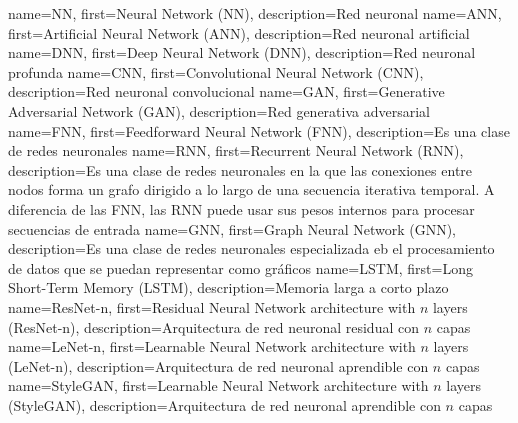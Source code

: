        {name={NN},         first={Neural Network (NN)},                                                description={Red neuronal}}
      {name={ANN},        first={Artificial Neural Network (ANN)},                                    description={Red neuronal artificial}}
      {name={DNN},        first={Deep Neural Network (DNN)},                                          description={Red neuronal profunda}}
      {name={CNN},        first={Convolutional Neural Network (CNN)},                                 description={Red neuronal convolucional}}
      {name={GAN},        first={Generative Adversarial Network (GAN)},                               description={Red generativa adversarial}}
      {name={FNN},        first={Feedforward Neural Network (FNN)},                                   description={Es una clase de redes neuronales}}
      {name={RNN},        first={Recurrent Neural Network (RNN)},                                     description={Es una clase de redes neuronales en la que las conexiones entre nodos forma un grafo dirigido a lo largo de una secuencia iterativa temporal. A diferencia de las FNN, las RNN puede usar sus pesos internos para procesar secuencias de entrada}}
      {name={GNN},        first={Graph Neural Network (GNN)},                                         description={Es una clase de redes neuronales especializada eb el procesamiento de datos que se puedan representar como gráficos}}
     {name={LSTM},       first={Long Short-Term Memory (LSTM)},                                      description={Memoria larga a corto plazo}}
 {name={ResNet-n},   first={Residual Neural Network architecture with $n$ layers (ResNet-n)},    description={Arquitectura de red neuronal residual con $n$ capas}}
  {name={LeNet-n},    first={Learnable Neural Network architecture with $n$ layers (LeNet-n)},    description={Arquitectura de red neuronal aprendible con $n$ capas}}
 {name={StyleGAN},   first={Learnable Neural Network architecture with $n$ layers (StyleGAN)},   description={Arquitectura de red neuronal aprendible con $n$ capas}}


